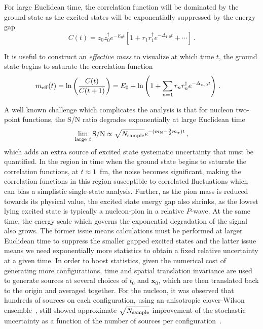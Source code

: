 \documentclass{ar-1col}
\newcommand{\change}[1]{{\color{red} #1}}
\def\D{\Delta}
\begin{document}
For large Euclidean time, the correlation function will be dominated by the ground state as the excited states will be exponentially suppressed by the energy gap
\begin{equation}
    C(t) = z_0 z_0^\dagger e^{-E_0 t}\left[
        1 + r_1 r^\dagger_1 e^{-\Delta_{1,0}t} + \cdots \right]\, .
\end{equation}%
\begin{marginnote}
\entry{$\D_{m,n}= E_m - E_n$}{energy gap}
\end{marginnote}%
It is useful to construct an \textit{effective mass} to visualize at which time $t$, the ground state begins to saturate the correlation function
\begin{align}
m_{\rm eff}(t) &= \ln \left( \frac{C(t)}{C(t+1)} \right)
    =
    E_0 + \ln\left( 1 + \sum_{n=1} r_n r^\dagger_n e^{-\Delta_{n,0}t}\right)\, .
\end{align}


A well known challenge which complicates the analysis is that for nucleon two-point functions, the S/N ratio degrades exponentially at large Euclidean time~\cite{Lepage:1989hd}
\begin{equation}
\lim_{{\rm large}\ t} {\rm S/N}%
    \propto \sqrt{N_{\mathrm{sample}}} e^{-(m_{\mathrm{N}} - \frac{3}{2}m_\pi)t}\, ,
\end{equation}
which adds an extra source of excited state systematic uncertainty that must be quantified.
\change{In} the region in time when the ground state begins to saturate the correlation functions, at $t\approx 1$~fm, the noise \change{becomes} significant, making the correlation functions in this region susceptible to correlated fluctuations which can bias a simplistic single-state analysis.
Further, as the pion mass is reduced towards its physical value, the excited state energy gap also shrinks, as the lowest lying excited state is typically a nucleon-pion in a relative $P$-wave.  At the same time, the energy scale which governs the exponential degradation of the signal also grows.  The former issue means calculations must be performed at larger Euclidean time to suppress the smaller gapped excited states and the latter issue means we need exponentially more statistics to obtain a fixed relative uncertainty at a given time.
In order to boost statistics, given the numerical cost of generating more configurations, time and spatial translation invariance are used to generate sources at several choices of $t_0$ and $\mathbf{x}_0$, which are then translated back to the origin and averaged together.  For the nucleon, it was observed that hundreds of sources on each configuration, using an anisotropic clover-Wilson ensemble~\cite{HadronSpectrum:2008xlg}, still showed approximate $\sqrt{N_{\rm sample}}$ improvement of the stochastic uncertainty as a function of the number of sources per configuration~\cite{Beane:2009kya}.
\end{document}
